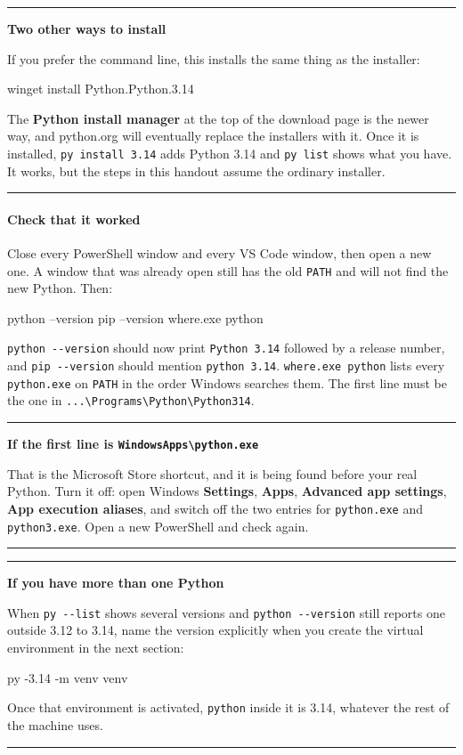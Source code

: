 \documentclass{article}
\newcommand{\cd}[1]{\texttt{#1}}
\newenvironment{keypoint}[1]
  {\par\vspace{.7em}\noindent\rule{\linewidth}{.6pt}\par\vspace{.15em}
   \noindent\textbf{#1}\par\nobreak\vspace{-.3em}}
  {\par\vspace{.15em}\noindent\rule{\linewidth}{.6pt}\par\vspace{.7em}}
\begin{document}
\begin{keypoint}{Two other ways to install}
If you prefer the command line, this installs the same thing as the
installer:

\begin{code}
winget install Python.Python.3.14
\end{code}

The \textbf{Python install manager} at the top of the download page is
the newer way, and python.org will eventually replace the installers with
it. Once it is installed, \cd{py install 3.14} adds Python 3.14 and
\cd{py list} shows what you have. It works, but the steps in this
handout assume the ordinary installer.
\end{keypoint}

\paragraph{Check that it worked}
Close every PowerShell window and every VS Code window, then open a new
one. A window that was already open still has the old \cd{PATH} and will
not find the new Python. Then:

\begin{code}
python --version
pip --version
where.exe python
\end{code}

\cd{python -{}-version} should now print \cd{Python 3.14} followed by a
release number, and \cd{pip -{}-version} should mention \cd{python 3.14}.
\cd{where.exe python} lists every \cd{python.exe} on \cd{PATH} in the
order Windows searches them. The first line must be the one in
\cd{...\textbackslash Programs\textbackslash Python\textbackslash Python314}.

\begin{keypoint}{If the first line is \texttt{WindowsApps\textbackslash python.exe}}
That is the Microsoft Store shortcut, and it is being found before your
real Python. Turn it off: open Windows \textbf{Settings},
\textbf{Apps}, \textbf{Advanced app settings}, \textbf{App execution
aliases}, and switch off the two entries for \cd{python.exe} and
\cd{python3.exe}. Open a new PowerShell and check again.
\end{keypoint}

\begin{keypoint}{If you have more than one Python}
When \cd{py -{}-list} shows several versions and \cd{python -{}-version}
still reports one outside 3.12 to 3.14, name the version explicitly when you create
the virtual environment in the next section:

\begin{code}
py -3.14 -m venv venv
\end{code}

Once that environment is activated, \cd{python} inside it is 3.14,
whatever the rest of the machine uses.
\end{keypoint}
\end{document}

